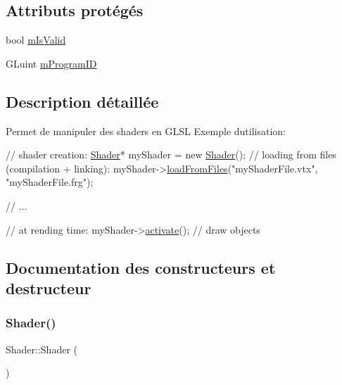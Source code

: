 \subsection*{Attributs protégés}
\begin{DoxyCompactItemize}
\item 
bool \hyperlink{class_shader_a2cf5f11fb1cfd53e9106285b6b9da0b4}{m\+Is\+Valid}
\item 
G\+Luint \hyperlink{class_shader_ad3c569bb2c0755c647ca139863d44b55}{m\+Program\+ID}
\end{DoxyCompactItemize}


\subsection{Description détaillée}
Permet de manipuler des shaders en G\+L\+SL Exemple d\textquotesingle{}utilisation\+: 
\begin{DoxyCode}
\textcolor{comment}{// shader creation:}
\hyperlink{class_shader}{Shader}* myShader = \textcolor{keyword}{new} \hyperlink{class_shader_a0d654ebaca4e0555197c0724c6d30610}{Shader}();
\textcolor{comment}{// loading from files (compilation + linking):}
myShader->\hyperlink{class_shader_ab3326b4493672d0e456e05d9b64c7b28}{loadFromFiles}(\textcolor{stringliteral}{"myShaderFile.vtx"}, \textcolor{stringliteral}{"myShaderFile.frg"});

\textcolor{comment}{// ...}

\textcolor{comment}{// at rending time:}
myShader->\hyperlink{class_shader_aac46b11981aef0616f45e191201f519a}{activate}();
\textcolor{comment}{// draw objects}
\end{DoxyCode}
 

\subsection{Documentation des constructeurs et destructeur}
\mbox{\label{class_shader_a0d654ebaca4e0555197c0724c6d30610}} 
\subsubsection{\texorpdfstring{Shader()}{Shader()}}
{\footnotesize\ttfamily Shader\+::\+Shader (\begin{DoxyParamCaption}{ }\end{DoxyParamCaption})\hspace{0.3cm}{\ttfamily [inline]}}

